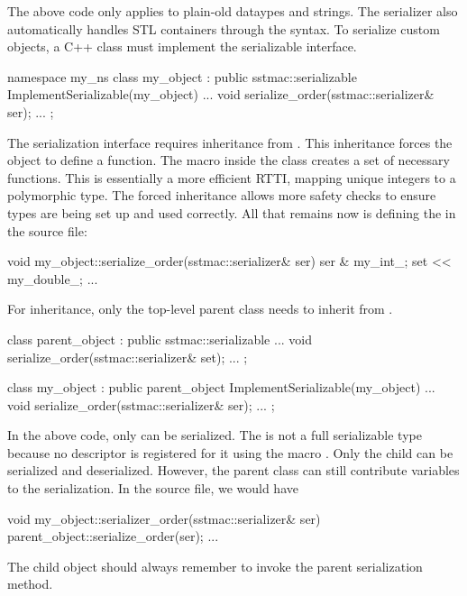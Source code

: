 The above code only applies to plain-old dataypes and strings.
The serializer also automatically handles STL containers
through the \inlinecode{&} syntax.
To serialize custom objects, a C++ class must implement the serializable interface.

\begin{CppCode}
namespace my_ns {
class my_object : 
  public sstmac::serializable
{
 ImplementSerializable(my_object)
 ...
 void serialize_order(sstmac::serializer& ser);
 ...
};
}
\end{CppCode}
The serialization interface requires inheritance from .
This inheritance forces the object to define a  function.
The macro  inside the class creates a set of necessary functions.
This is essentially a more efficient RTTI, mapping unique integers to a polymorphic type.
The forced inheritance allows more safety checks to ensure types are being set up and used correctly.
All that remains now is defining the  in the source file:

\begin{CppCode}
void my_object::serialize_order(sstmac::serializer& ser)
{
  ser & my_int_;
  set << my_double_;
  ...
}
\end{CppCode}

For inheritance, only the top-level parent class needs to inherit from .

\begin{CppCode}
class parent_object : 
  public sstmac::serializable
{
...
  void serialize_order(sstmac::serializer& set);
...
};

class my_object :
  public parent_object
{
 ImplementSerializable(my_object)
 ...
 void serialize_order(sstmac::serializer& ser);
 ...
};
\end{CppCode}
In the above code, only  can be serialized.
The  is not a full serializable type because no descriptor is registered for it
using the macro .
Only the child can be serialized and deserialized.
However, the parent class can still contribute variables to the serialization.
In the source file, we would have

\begin{CppCode}
void my_object::serializer_order(sstmac::serializer& ser)
{
  parent_object::serialize_order(ser);
  ...
}
\end{CppCode}
The child object should always remember to invoke the parent serialization method.

